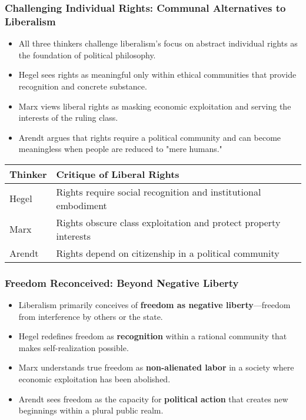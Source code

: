 \documentclass{beamer}
\begin{document}
\begin{frame}
\frametitle{Challenging Individual Rights: Communal Alternatives to Liberalism}
\begin{itemize}
    \item All three thinkers challenge liberalism's focus on abstract individual rights as the foundation of political philosophy.
    \item Hegel sees rights as meaningful only within ethical communities that provide recognition and concrete substance.
    \item Marx views liberal rights as masking economic exploitation and serving the interests of the ruling class.
    \item Arendt argues that rights require a political community and can become meaningless when people are reduced to "mere humans."
\end{itemize}

\begin{center}
\begin{tabular}{lp{8cm}}
\toprule
\textbf{Thinker} & \textbf{Critique of Liberal Rights} \\
\midrule
Hegel & Rights require social recognition and institutional embodiment \\
Marx & Rights obscure class exploitation and protect property interests \\
Arendt & Rights depend on citizenship in a political community \\
\bottomrule
\end{tabular}
\end{center}
\end{frame}

\begin{frame}
\frametitle{Freedom Reconceived: Beyond Negative Liberty}
\begin{itemize}
    \item Liberalism primarily conceives of \textbf{freedom as negative liberty}—freedom from interference by others or the state.
    \item Hegel redefines freedom as \textbf{recognition} within a rational community that makes self-realization possible.
    \item Marx understands true freedom as \textbf{non-alienated labor} in a society where economic exploitation has been abolished.
    \item Arendt sees freedom as the capacity for \textbf{political action} that creates new beginnings within a plural public realm.
\end{itemize}

\end{frame}
\end{document}

